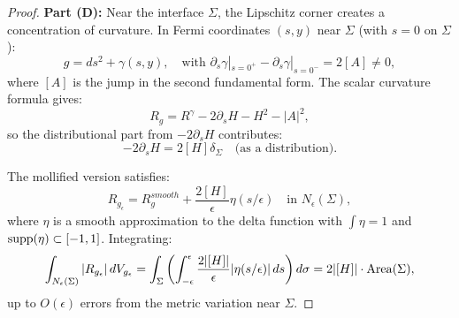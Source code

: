 \begin{proof}
\textbf{Part (D):} Near the interface $\Sigma$, the Lipschitz corner creates a concentration of curvature. In Fermi coordinates $(s, y)$ near $\Sigma$ (with $s = 0$ on $\Sigma$):
\begin{equation}
    g = ds^2 + \gamma(s, y), \quad \text{with } \partial_s \gamma|_{s=0^+} - \partial_s \gamma|_{s=0^-} = 2[A] \ne 0,
\end{equation}
where $[A]$ is the jump in the second fundamental form. The scalar curvature formula gives:
\begin{equation}
    R_g = R^\gamma - 2\partial_s H - H^2 - |A|^2,
\end{equation}
so the distributional part from $-2\partial_s H$ contributes:
\begin{equation}
    -2\partial_s H = 2[H] \delta_\Sigma \quad \text{(as a distribution)}.
\end{equation}

The mollified version satisfies:
\begin{equation}
    R_{g_\epsilon} = R_g^{smooth} + \frac{2[H]}{\epsilon} \eta(s/\epsilon) \quad \text{in } N_\epsilon(\Sigma),
\end{equation}
where $\eta$ is a smooth approximation to the delta function with $\int \eta = 1$ and $\mathrm{supp}(\eta) \subset [-1, 1]$. Integrating:
\begin{equation}
    \int_{N_\epsilon(\Sigma)} |R_{g_\epsilon}| \, dV_{g_\epsilon} = \int_\Sigma \left( \int_{-\epsilon}^\epsilon \frac{2|[H]|}{\epsilon} |\eta(s/\epsilon)| \, ds \right) d\sigma = 2|[H]| \cdot \operatorname{Area}(\Sigma),
\end{equation}
up to $O(\epsilon)$ errors from the metric variation near $\Sigma$.
\end{proof}

